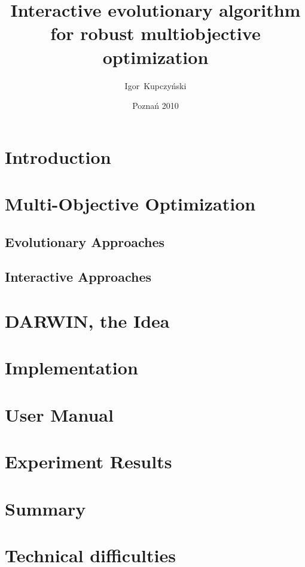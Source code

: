 \documentclass[a4paper,english,thesis]{dcsbook}
\author{Igor~Kupczy\'nski}
\date{Pozna\'n 2010}
\title{Interactive evolutionary algorithm \\ for robust multiobjective
  optimization}
\begin{document}
\maketitle
\frontmatter
\tableofcontents{}
\mainmatter

\chapter{Introduction}

\chapter{Multi-Objective Optimization}
\section{Evolutionary Approaches}
\section{Interactive Approaches}

\chapter{DARWIN, the Idea}

\chapter{Implementation}
\chapter{User Manual}

\chapter{Experiment Results}

\chapter{Summary}


\backmatter



\appendix
\appendixpage
\addappheadtotoc
\chapter{Technical difficulties}
\end{document}
